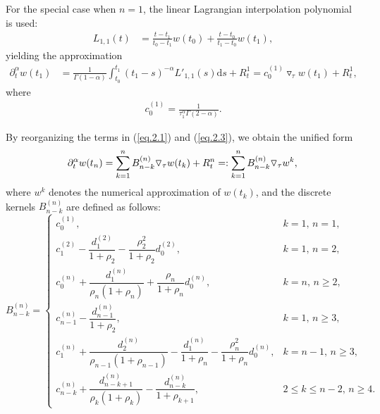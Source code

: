 \documentclass{siamart171218}
\theoremstyle{remark}
\theoremstyle{example}
\numberwithin{equation}{section}
\begin{document}
For the special case when $n=1$, the linear Lagrangian interpolation polynomial is used:
\begin{align*}
L_{1,1}(t) &= \frac{t - t_1}{t_0 - t_1}w(t_0) + \frac{t - t_0}{t_1 - t_0}w(t_1),
\end{align*}
yielding the approximation
\begin{equation}\label{eq.2.3}
	\begin{aligned}
		\partial^\alpha_t w(t_1) &= \frac{1}{\Gamma(1-\alpha)} \int_{t_0}^{t_1} (t_1 - s)^{-\alpha} L'_{1,1}(s)  \mathrm{d}s + R_t^1
		= c_0^{(1)} \triangledown_\tau w(t_1) + R_t^1,
	\end{aligned}
\end{equation}
where
\begin{align*}
c_0^{(1)} = \frac{1}{\tau_1^\alpha \Gamma(2-\alpha)}.
\end{align*}

By reorganizing the terms in (\ref{eq.2.1}) and (\ref{eq.2.3}), we obtain the unified form
\begin{equation}\label{eq.2.5}
\partial^\alpha_t w(t_n) = \sum_{k=1}^n B_{n-k}^{(n)}
 \triangledown_\tau w(t_k) + R_t^n
 =:\sum_{k=1}^n B_{n-k}^{(n)}
 \triangledown_\tau w^k, \\
\end{equation}
where \( w^k \) denotes the numerical approximation of
 \( w(t_k) \), and the discrete kernels \( B_{n-k}^{(n)} \)
 are defined as follows:
\begin{equation}\label{eq.2.6}
	B_{n-k}^{(n)} =
	\begin{cases}
		c_0^{(1)}, & k = 1, \, n = 1, \\
		c_1^{(2)} - \dfrac{d_1^{(2)}}{1 + \rho_2} - \dfrac{\rho_2^2}{1 + \rho_2} d_0^{(2)}, & k = 1, \, n = 2, \\
		c_0^{(n)} + \dfrac{d_1^{(n)}}{\rho_n (1 + \rho_n)} + \dfrac{\rho_n}{1 + \rho_n} d_0^{(n)}, & k = n, \, n \geq 2, \\
		c_{n-1}^{(n)} - \dfrac{d_{n-1}^{(n)}}{1 + \rho_2}, & k = 1, \, n \geq 3, \\
		c_1^{(n)} + \dfrac{d_2^{(n)}}{\rho_{n-1} (1 + \rho_{n-1})} - \dfrac{d_1^{(n)}}{1 + \rho_n} - \dfrac{\rho_n^2}{1 + \rho_n} d_0^{(n)}, & k = n-1, \, n \geq 3, \\
		c_{n-k}^{(n)} + \dfrac{d_{n-k+1}^{(n)}}{\rho_k (1 + \rho_k)} - \dfrac{d_{n-k}^{(n)}}{1 + \rho_{k+1}}, & 2 \leq k \leq n-2, \, n \geq 4.
	\end{cases}
\end{equation}
\end{document}
